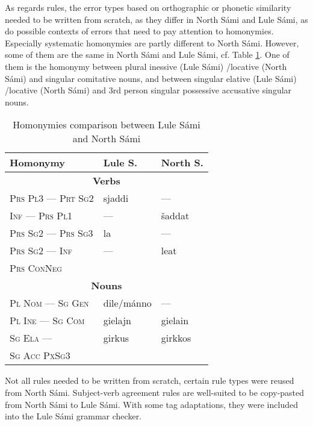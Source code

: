 \documentclass[free]{flammie}
\begin{document}
As regards rules, the error types based on orthographic or phonetic similarity
needed to be written from scratch, as they differ in North Sámi and Lule Sámi,
as do possible contexts of errors that need to pay attention to homonymies.
Especially systematic homonymies are partly different to North Sámi. However,
some of them are the same in North Sámi and Lule Sámi, cf. Table
\ref{comparison}.  One of them is the homonymy between plural inessive (Lule
Sámi) /locative (North Sámi) and singular comitative nouns, and between singular
elative (Lule Sámi) /locative (North Sámi) and 3rd person singular possessive
accusative singular nouns.



\begin{table}[htb]
    \centering
    \begin{tabular}{lll}
         \textbf{Homonymy} & \textbf{Lule S.}  & \textbf{North S.}\\
         \toprule
         \multicolumn{3}{c}{\textbf{Verbs}} \\
         \midrule
         \textsc{Prs Pl3} --- \textsc{Prt Sg2} & sjaddi &  --- \\
         \textsc{Inf} --- \textsc{Prs Pl1} & --- &  šaddat \\
         \textsc{Prs Sg2} --- \textsc{Prs Sg3} & la &  --- \\
          \textsc{Prs Sg2} --- \textsc{Inf} & --- &  leat \\
                  \textsc{Prs ConNeg} &  &   \\
         \midrule
         \multicolumn{3}{c}{\textbf{Nouns}} \\
         \midrule
         \textsc{Pl Nom} --- \textsc{Sg Gen} & dile/mánno &  --- \\
         \textsc{Pl Ine} --- \textsc{Sg Com} & gielajn &  gielain \\
         \textsc{Sg Ela} ---  & girkus & girkkos \\
        \textsc{Sg Acc PxSg3} &  &  \\



         \bottomrule
         \end{tabular}
    \caption{Homonymies comparison  between Lule Sámi and North
    Sámi\label{comparison}}
\end{table}

Not all rules needed to be written from scratch, certain rule types were reused
from North Sámi.  Subject-verb agreement rules are well-suited to be copy-pasted
from North Sámi to Lule Sámi. With some tag adaptations, they were included into
the Lule Sámi grammar checker.
\end{document}
